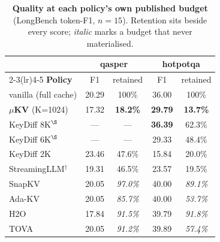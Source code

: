 \documentclass[sigconf,10pt]{acmart}
\begin{document}
\begin{table}[t]
\caption{\textbf{Quality at each policy's own published budget} (LongBench token-F1, $n{=}15$). Retention sits beside every score; \emph{italic} marks a budget that never materialised.}
\label{tab:quality}
\small
\setlength{\tabcolsep}{4pt}
\begin{tabular}{lcccc}
\toprule
 & \multicolumn{2}{c}{\textbf{qasper}} & \multicolumn{2}{c}{\textbf{hotpotqa}} \\
\cmidrule(lr){2-3}\cmidrule(lr){4-5}
\textbf{Policy} & F1 & retained & F1 & retained \\
\midrule
vanilla (full cache)   & 20.29 & 100\% & 36.00 & 100\% \\
\textbf{$\mu$KV} (K=1024) & 17.32 & \textbf{18.2\%} & \textbf{29.79} & \textbf{13.7\%} \\
KeyDiff 8K$^{\S}$      & ---   & ---   & \textbf{36.39} & 62.3\% \\
KeyDiff 6K$^{\S}$      & ---   & ---   & 29.33 & 48.4\% \\
KeyDiff 2K             & 23.46 & 47.6\% & 15.84 & 20.0\% \\
StreamingLLM$^\dagger$ & 19.31 & 46.5\% & 23.57 & 19.5\% \\
SnapKV                 & 20.05 & \textit{97.0\%} & 40.00 & \textit{89.1\%} \\
Ada-KV                 & 20.05 & \textit{85.7\%} & 40.00 & \textit{53.7\%} \\
H2O                    & 17.84 & \textit{91.5\%} & 39.79 & \textit{91.8\%} \\
TOVA                   & 20.05 & \textit{91.2\%} & 39.89 & \textit{57.4\%} \\
\bottomrule
\end{tabular}
\end{table}
\end{document}
